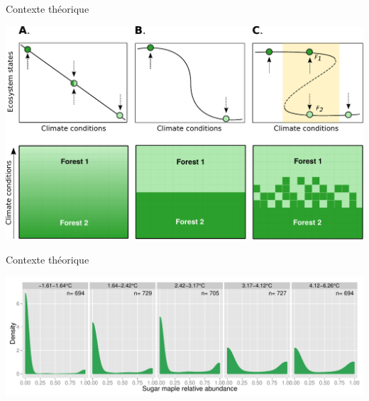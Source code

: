 \documentclass{eecslides}
\begin{document}
	\begin{frame}{Contexte théorique}
		\begin{center}
		\includegraphics[height=0.6\textheight]{states}\\
		\end{center}
	\end{frame}


	\begin{frame}{Contexte théorique}
		\begin{center}
		\includegraphics[height=0.4\textheight]{ass_ers}\\
		\end{center}
	\end{frame}

%

\end{document}
